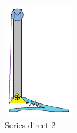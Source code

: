 \begin{figure}[hb!]
\begin{subfigure}{.19\textwidth}
      \includegraphics[width=\linewidth]{figures/illustration_serial_direct_ii.pdf}
      \caption{Series direct 2}
      \label{fig:series_direct_ii}
    \end{subfigure}
    \begin{subfigure}{.19\textwidth}
      \centering

\end{subfigure}
\end{figure}
